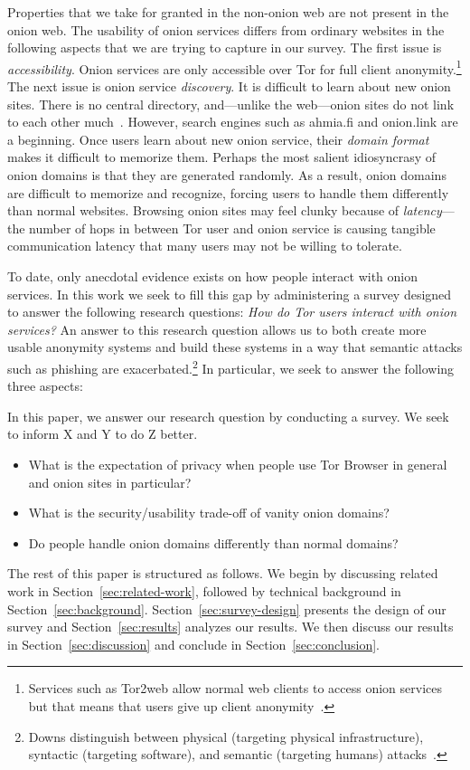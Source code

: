 Properties that we take for granted in the non-onion web are not present in the
onion web.  The usability of onion services differs from ordinary websites in
the following aspects that we are trying to capture in our survey.  The first
issue is \emph{accessibility}.  Onion services are only accessible over Tor for
full client anonymity.\footnote{Services such as Tor2web allow normal web
clients to access onion services but that means that users give up client
anonymity~\cite{tor2web}.} The next issue is onion service \emph{discovery}.
It is difficult to learn about new onion sites.  There is no central directory,
and---unlike the web---onion sites do not link to each other
much~\cite{Griffith2017a}.  However, search engines such as ahmia.fi and
onion.link are a beginning.  Once users learn about new onion service, their
\emph{domain format} makes it difficult to memorize them.  Perhaps the most
salient idiosyncrasy of onion domains is that they are generated randomly.  As
a result, onion domains are difficult to memorize and recognize, forcing users
to handle them differently than normal websites.  Browsing onion sites may feel
clunky because of \emph{latency}---the number of hops in between Tor user and
onion service is causing tangible communication latency that many users may not
be willing to tolerate.

To date, only anecdotal evidence exists on how people interact with onion
services.  In this work we seek to fill this gap by administering a survey
designed to answer the following research questions: \emph{How do Tor users
interact with onion services?}  An answer to this research question allows us
to both create more usable anonymity systems and build these systems in a way
that semantic attacks such as phishing are exacerbated.\footnote{Downs \ea
distinguish between physical (\ie targeting physical infrastructure),
syntactic (\ie targeting software), and semantic (\ie targeting humans)
attacks~\cite[\S~1]{Downs2006a}.}  In particular, we seek to answer the
following three aspects:

In this paper, we answer our research question by conducting a survey.
We seek to inform X and Y to do Z better.

\begin{itemize}
    \item What is the expectation of privacy when people use Tor Browser in
        general and onion sites in particular?
    \item What is the security/usability trade-off of vanity onion domains?
    \item Do people handle onion domains differently than normal domains?
\end{itemize}

The rest of this paper is structured as follows.  We begin by discussing related
work in Section~\ref{sec:related-work}, followed by technical background in
Section~\ref{sec:background}.  Section~\ref{sec:survey-design} presents the
design of our survey and Section~\ref{sec:results} analyzes our results.  We
then discuss our results in Section~\ref{sec:discussion} and conclude in
Section~\ref{sec:conclusion}.

